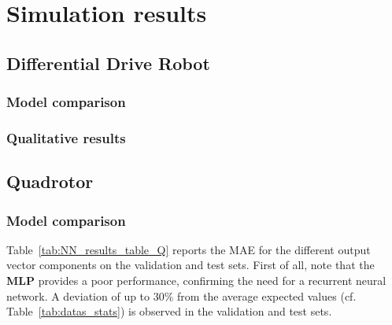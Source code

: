 \section{Simulation results}\label{sec:nn_results}

\subsection{Differential Drive Robot}\label{sec:nn_results_unic}

\subsubsection{Model comparison}\label{sec:nn_comparaison_unic}



\subsubsection{Qualitative results}

\subsection{Quadrotor}\label{sec:nn_results_quad}

\subsubsection{Model comparison}\label{sec:nn_comparaison_quad}



Table~\ref{tab:NN_results_table_Q} reports the MAE for the different output vector components on the validation and test sets. 
First of all, note that the \textbf{MLP} provides a poor performance, confirming the need for a recurrent neural network.
A deviation of up to 30\% from the average expected values (cf. Table~\ref{tab:datas_stats}) is observed in the validation and test sets.

